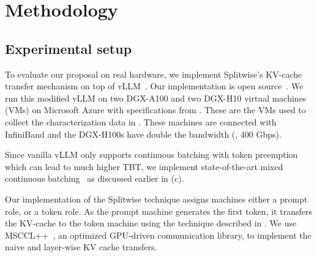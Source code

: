 \section{Methodology}
\label{sec:method}

\subsection{Experimental setup}
\label{sec:expt_setup}

To evaluate our proposal on real hardware, we implement Splitwise's KV-cache transfer mechanism on top of vLLM~\cite{vllm}. Our implementation is open source~\cite{splitwise_vllm_pr}.
We run this modified vLLM on two DGX-A100 and two DGX-H10 virtual machines (VMs) on Microsoft Azure with specifications from .
These are the VMs used to collect the characterization data in .
These machines are connected with InfiniBand and the DGX-H100s have double the bandwidth (\ie, 400 Gbps).

Since vanilla vLLM only supports continuous batching with token preemption which can lead to much higher TBT, we implement state-of-the-art mixed continuous batching~\cite{yu2022orca} as discussed earlier in (c).

Our implementation of the Splitwise technique assigns machines either a prompt role, or a token role.
As the prompt machine generates the first token, it transfers the KV-cache to the token machine using the technique described in .
We use MSCCL++~\cite{mscclpp}, an optimized GPU-driven communication library, to implement the naive and layer-wise KV cache transfers.


